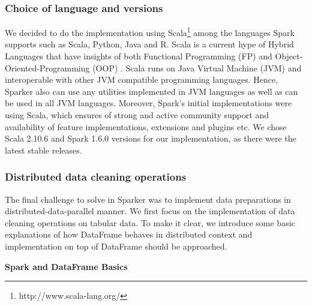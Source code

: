 \subsubsection{Choice of language and versions}
We decided to do the implementation using Scala\footnote{http://www.scala-lang.org/} among the languages Spark supports such as Scala, Python, Java and R. Scala is a current hype of Hybrid Languages that have insights of both Functional Programming (FP) and Object-Oriented-Programming (OOP) \cite{scala-book}. Scala runs on Java Virtual Machine (JVM) and interoperable with other JVM compatible programming languages. Hence, Sparker also can use any utilities implemented in JVM languages as well as can be used in all JVM languages. Moreover, Spark's initial implementations were using Scala, which ensures of strong and active community support and availability of feature implementations, extensions and plugins etc. We chose Scala 2.10.6 and Spark 1.6.0 versions for our implementation, as there were the latest stable releases. 
\subsubsection{Distributed data cleaning operations}
 The final challenge to solve in Sparker was to implement data preparations in distributed-data-parallel manner. We first focus on the implementation of data cleaning operations on tabular data. To make it clear, we introduce some basic explanations of how DataFrame behaves in distributed context and implementation on top of DataFrame should be approached. 
 
 \textbf{Spark and DataFrame Basics}
 
